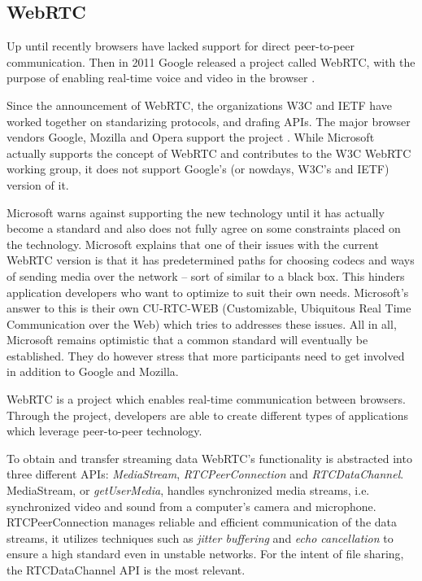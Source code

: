 \subsection{WebRTC}

Up until recently browsers have lacked support for direct peer-to-peer communication. Then in 2011 Google released a project called WebRTC, with the purpose of enabling real-time voice and video in the browser \cite{WebRTCMemo:Online}.

Since the announcement of WebRTC, the organizations W3C and IETF have worked together on standarizing protocols, and drafing APIs. The major browser vendors Google, Mozilla and Opera support the project \cite{WebRTCAndMicrosoft:2012:Online}. While Microsoft actually supports the concept of WebRTC and contributes to the W3C WebRTC working group, it does not support Google’s (or nowdays, W3C’s and IETF) version of it\cite{WebRTCAndMicrosoft:2012:Online}.

Microsoft warns against supporting the new technology until it has actually become a standard and also does not fully agree on some constraints placed on the technology\cite{WebRTCAndMicrosoft:2012:Online}. Microsoft explains that one of their issues with the current WebRTC version is that it has predetermined paths for choosing codecs and ways of sending media over the network – sort of similar to a black box. This hinders application developers who want to optimize to suit their own needs. Microsoft’s answer to this is their own CU-RTC-WEB (Customizable, Ubiquitous Real Time Communication over the Web) which tries to addresses these issues.
All in all, Microsoft remains optimistic that a common standard will eventually be established\cite{WebRTCAndMicrosoft:2012:Online}. They do however stress that more participants need to get involved in addition to Google and Mozilla. 

WebRTC is a project which enables real-time communication between browsers\cite{WebRTC:Online}. Through the project, developers are able to create different types of applications which leverage peer-to-peer technology.

To obtain and transfer streaming data WebRTC's functionality is abstracted into three different APIs: \emph{MediaStream}, \emph{RTCPeerConnection} and \emph{RTCDataChannel}\cite{WebRTCBasics:2012:Online}. MediaStream, or \emph{getUserMedia}, handles synchronized media streams, i.e. synchronized video and sound from a computer's camera and microphone. RTCPeerConnection manages reliable and efficient communication of the data streams, it utilizes techniques such as \emph{jitter buffering} and \emph{echo cancellation} to ensure a high standard even in unstable networks. For the intent of file sharing, the RTCDataChannel API is the most relevant.


